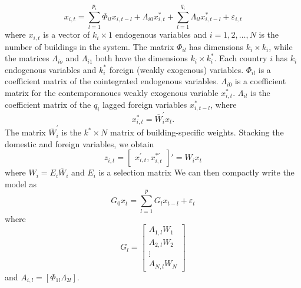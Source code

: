 \documentclass[preprint, 12pt]{elsarticle}
\newcommand{\?}{\stackrel{?}{=}}
\newcommand{\ol}{\overline}
\begin{document}
\begin{equation}
  \label{eq:1}
  x_{i,t} = \sum_{l=1}^{p_{i}}\Phi_{il}x_{i,t-l} + \Lambda_{i0}x_{i,t}^{*} + \sum_{l=1}^{q_{i}}\Lambda_{il}x_{i,t-l}^{*} + \varepsilon_{i,t}
\end{equation}
where $x_{i,t}$ is a vector of $k_{i}\times 1$ endogenous variables and $i = 1, 2, \ldots, N$ is the number of buildings
in the system.  The matrix $\Phi_{il}$ has dimensions $k_{i}\times k_{i}$, while the matrices $\Lambda_{io}$ and
$\Lambda_{i1}$ both have the dimensions $k_{i}\times k_{i}^{*}$.
Each country $i$ has $k_{i}$ endogenous variables and $k_{i}^{*}$ foreign (weakly exogenous) variables.
$\Phi_{il}$ is a coefficient matrix of the cointegrated
endogenous variables. $\Lambda_{i0}$ is a coefficient matrix for the contemporanoues weakly exogenous variable
$x_{i,t}^{*}$. $\Lambda_{il}$ is the coefficient matrix of the $q_{i}$ lagged foreign variables $x_{i,t-l}^{*}$, where
\begin{equation}
  \label{eq:2}
  x_{i,t}^{*} = \ol{W}_{i}^{'}x_{t}.
\end{equation}
The matrix $\ol{W}_{i}^{'}$ is the $k^{*} \times N$ matrix of building-specific weights.
Stacking the domestic and foreign variables, we obtain
\begin{equation}
  \label{eq:3}
  z_{i,t} =
  \begin{bmatrix}
    x_{i,t}^{'}, x_{i,t}^{*'}
  \end{bmatrix}'  = W_{i}x_{t}
\end{equation}
where $W_{i} = E_{i}\ol{W}_{i}$ and $E_{i}$ is a selection matrix We
can then compactly write the model as
\begin{equation}
  \label{eq:4}
  G_{0}x_{t} = \sum_{l=1}^{p}G_{l}x_{t-l} + \varepsilon_{t}
\end{equation}
where
\begin{equation}
  \label{eq:5}
  G_{l} =
  \begin{bmatrix}
    A_{1,l}W_{1}\\ A_{2,l}W_{2}\\ \vdots \\A_{N,l}W_{N}
  \end{bmatrix}
\end{equation}
and $A_{i,l} = [\Phi_{1l}  \Lambda_{2l}]$.
\end{document}
